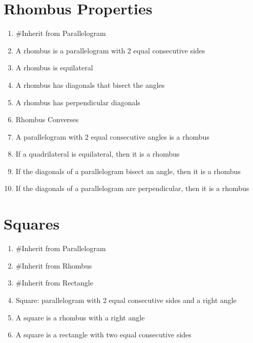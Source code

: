 \documentclass[11pt,letterpaper]{report}
\begin{document}
\section*{Rhombus Properties}
\begin{enumerate}
    \item \#Inherit from Parallelogram
    \item A rhombus is a parallelogram with 2 equal consecutive sides
    \item A rhombus is equilateral
    \item A rhombus has diagonals that bisect the angles
    \item A rhombus has perpendicular diagonals
    \item Rhombus Converses
    \item A parallelogram with 2 equal consecutive angles is a rhombus
    \item If a quadrilateral is equilateral, then it is a rhombus
    \item If the diagonals of a parallelogram bisect an angle, then it is a rhombus
    \item If the diagonals of a parallelogram are perpendicular, then it is a rhombus
\end{enumerate}

\section*{Squares}
\begin{enumerate}
    \item \#Inherit from Parallelogram
    \item \#Inherit from Rhombus
    \item \#Inherit from Rectangle
    \item Square: parallelogram with 2 equal consecutive sides and a right angle
    \item A square is a rhombus with a right angle
    \item A square is a rectangle with two equal consecutive sides
\end{enumerate}
\end{document}
